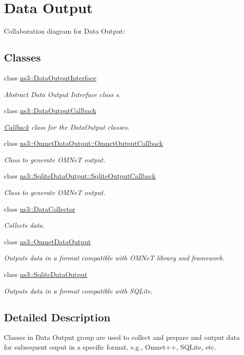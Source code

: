 \hypertarget{group__dataoutput}{}\section{Data Output}
\label{group__dataoutput}
Collaboration diagram for Data Output\+:
\subsection*{Classes}
\begin{DoxyCompactItemize}
\item 
class \hyperlink{classns3_1_1DataOutputInterface}{ns3\+::\+Data\+Output\+Interface}
\begin{DoxyCompactList}\small\item\em Abstract Data Output Interface class s. \end{DoxyCompactList}\item 
class \hyperlink{classns3_1_1DataOutputCallback}{ns3\+::\+Data\+Output\+Callback}
\begin{DoxyCompactList}\small\item\em \hyperlink{classns3_1_1Callback}{Callback} class for the Data\+Output classes. \end{DoxyCompactList}\item 
class \hyperlink{classns3_1_1OmnetDataOutput_1_1OmnetOutputCallback}{ns3\+::\+Omnet\+Data\+Output\+::\+Omnet\+Output\+Callback}
\begin{DoxyCompactList}\small\item\em Class to generate O\+M\+NeT output. \end{DoxyCompactList}\item 
class \hyperlink{classns3_1_1SqliteDataOutput_1_1SqliteOutputCallback}{ns3\+::\+Sqlite\+Data\+Output\+::\+Sqlite\+Output\+Callback}
\begin{DoxyCompactList}\small\item\em Class to generate O\+M\+NeT output. \end{DoxyCompactList}\item 
class \hyperlink{classns3_1_1DataCollector}{ns3\+::\+Data\+Collector}
\begin{DoxyCompactList}\small\item\em Collects data. \end{DoxyCompactList}\item 
class \hyperlink{classns3_1_1OmnetDataOutput}{ns3\+::\+Omnet\+Data\+Output}
\begin{DoxyCompactList}\small\item\em Outputs data in a format compatible with O\+M\+NeT library and framework. \end{DoxyCompactList}\item 
class \hyperlink{classns3_1_1SqliteDataOutput}{ns3\+::\+Sqlite\+Data\+Output}
\begin{DoxyCompactList}\small\item\em Outputs data in a format compatible with S\+Q\+Lite. \end{DoxyCompactList}\end{DoxyCompactItemize}


\subsection{Detailed Description}
Classes in Data Output group are used to collect and prepare and output data for subsequent ouput in a specific format, e.\+g., Omnet++, S\+Q\+Lite, etc. 